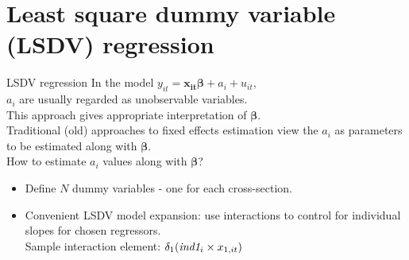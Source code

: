 \documentclass[usenames,dvipsnames]{beamer}
\newcommand{\mytikzmark}[2]{%
  \tikz[remember picture,inner sep=0pt,outer sep=0pt,baseline,anchor=base] 
    \node (#1) {\ensuremath{#2}};}
\begin{document}
\section{Least square dummy variable (LSDV) regression}
\begin{frame}{LSDV regression}
In the model $y_{it} = \bm{x_{it} \beta} + a_i + u_{it}$, \\
\medskip
$a_i$ are usually regarded as unobservable variables. \\
This approach gives appropriate interpretation of $\bm{\beta}$. \\
Traditional (old) approaches to fixed effects estimation view the $a_i$ as parameters to be estimated along with $\bm{\beta}$. \\
\medskip
How to estimate $a_i$ values along with $\bm{\beta}$?
\begin{itemize}
\item Define $N$ dummy variables - one for each cross-section.
\item Convenient LSDV model expansion: use interactions to control for individual slopes for chosen regressors. \\
Sample interaction element: \quad $\mytikzmark{delta}{\delta_1} (\mytikzmark{ind}{\textit{ind1}_i} \times \mytikzmark{x}{x_{1, it}})$ 
\end{itemize}
\end{frame}
\end{document}
